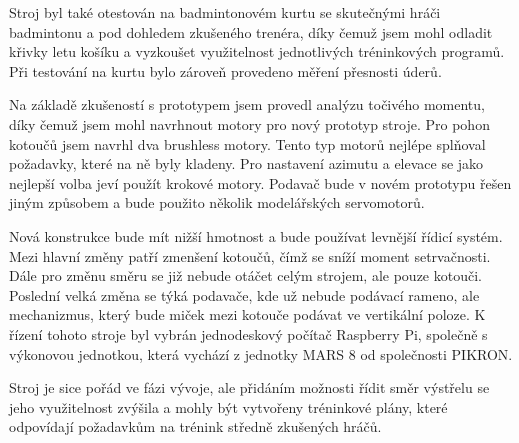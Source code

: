 Stroj byl také otestován na badmintonovém kurtu se skutečnými hráči badmintonu a pod dohledem zkušeného trenéra, díky čemuž jsem mohl odladit křivky letu košíku a vyzkoušet využitelnost jednotlivých tréninkových programů. Při testování na kurtu bylo zároveň provedeno měření přesnosti úderů.

Na základě zkušeností s prototypem jsem provedl analýzu točivého momentu, díky čemuž jsem mohl navrhnout motory pro nový prototyp stroje. Pro pohon kotoučů jsem navrhl dva brushless motory. Tento typ motorů nejlépe splňoval požadavky, které na ně byly kladeny. Pro nastavení azimutu a elevace se jako nejlepší volba jeví použít krokové motory. Podavač bude v novém prototypu řešen jiným způsobem a bude použito několik modelářských servomotorů.

Nová konstrukce bude mít nižší hmotnost a bude používat levnější řídicí systém. Mezi hlavní změny patří zmenšení kotoučů, čímž se sníží moment setrvačnosti. Dále pro změnu směru se již nebude otáčet celým strojem, ale pouze kotouči. Poslední velká změna se týká podavače, kde už nebude podávací rameno, ale mechanizmus, který bude miček mezi kotouče podávat ve vertikální poloze. K řízení tohoto stroje byl vybrán jednodeskový počítač Raspberry Pi, společně s výkonovou jednotkou, která vychází z jednotky MARS 8 od společnosti PIKRON.

Stroj je sice pořád ve fázi vývoje, ale přidáním možnosti řídit směr výstřelu se jeho využitelnost zvýšila a mohly být vytvořeny tréninkové plány, které odpovídají požadavkům na trénink středně zkušených hráčů.




